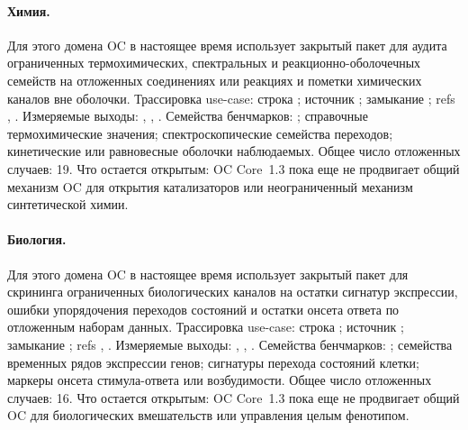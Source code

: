 \paragraph{Химия.}
Для этого домена OC в настоящее время использует закрытый пакет для аудита ограниченных термохимических, спектральных и реакционно-оболочечных семейств на отложенных соединениях или реакциях и пометки химических каналов вне оболочки.
Трассировка use-case: строка ; \allowbreak источник ; \allowbreak замыкание ; \allowbreak refs , \allowbreak {}.
Измеряемые выходы: , , .
Семейства бенчмарков: ; справочные термохимические значения; спектроскопические семейства переходов; кинетические или равновесные оболочки наблюдаемых.
Общее число отложенных случаев: 19.
Что остается открытым: OC Core~1.3 пока еще не продвигает общий механизм OC для открытия катализаторов или неограниченный механизм синтетической химии.

\paragraph{Биология.}
Для этого домена OC в настоящее время использует закрытый пакет для скрининга ограниченных биологических каналов на остатки сигнатур экспрессии, ошибки упорядочения переходов состояний и остатки онсета ответа по отложенным наборам данных.
Трассировка use-case: строка ; \allowbreak источник ; \allowbreak замыкание ; \allowbreak refs , \allowbreak {}.
Измеряемые выходы: , , .
Семейства бенчмарков: ; семейства временных рядов экспрессии генов; сигнатуры перехода состояний клетки; маркеры онсета стимула-ответа или возбудимости.
Общее число отложенных случаев: 16.
Что остается открытым: OC Core~1.3 пока еще не продвигает общий OC для биологических вмешательств или управления целым фенотипом.

